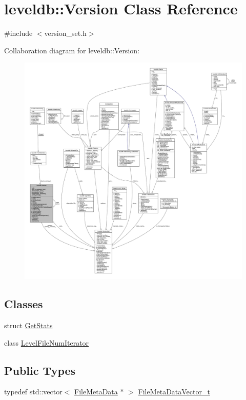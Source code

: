 \hypertarget{classleveldb_1_1_version}{}\section{leveldb\+:\+:Version Class Reference}
\label{classleveldb_1_1_version}


{\ttfamily \#include $<$version\+\_\+set.\+h$>$}



Collaboration diagram for leveldb\+:\+:Version\+:
\nopagebreak
\begin{figure}[H]
\begin{center}
\leavevmode
\includegraphics[width=350pt]{classleveldb_1_1_version__coll__graph}
\end{center}
\end{figure}
\subsection*{Classes}
\begin{DoxyCompactItemize}
\item 
struct \hyperlink{structleveldb_1_1_version_1_1_get_stats}{Get\+Stats}
\item 
class \hyperlink{classleveldb_1_1_version_1_1_level_file_num_iterator}{Level\+File\+Num\+Iterator}
\end{DoxyCompactItemize}
\subsection*{Public Types}
\begin{DoxyCompactItemize}
\item 
typedef std\+::vector$<$ \hyperlink{structleveldb_1_1_file_meta_data}{File\+Meta\+Data} $\ast$ $>$ \hyperlink{classleveldb_1_1_version_a8bc33777ed6e3b7a6bc1202c89c567b6}{File\+Meta\+Data\+Vector\+\_\+t}
\end{DoxyCompactItemize}
